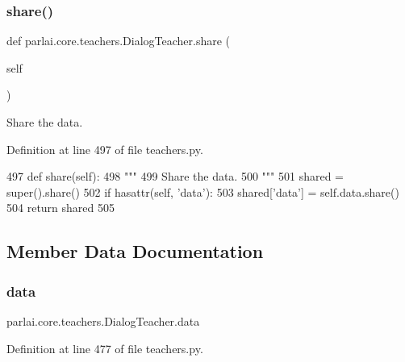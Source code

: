 \subsubsection{\texorpdfstring{share()}{share()}}
{\footnotesize\ttfamily def parlai.\+core.\+teachers.\+Dialog\+Teacher.\+share (\begin{DoxyParamCaption}\item[{}]{self }\end{DoxyParamCaption})}

\begin{DoxyVerb}Share the data.
\end{DoxyVerb}
 

Definition at line 497 of file teachers.\+py.


\begin{DoxyCode}
497     \textcolor{keyword}{def }share(self):
498         \textcolor{stringliteral}{"""}
499 \textcolor{stringliteral}{        Share the data.}
500 \textcolor{stringliteral}{        """}
501         shared = super().share()
502         \textcolor{keywordflow}{if} hasattr(self, \textcolor{stringliteral}{'data'}):
503             shared[\textcolor{stringliteral}{'data'}] = self.data.share()
504         \textcolor{keywordflow}{return} shared
505 
\end{DoxyCode}


\subsection{Member Data Documentation}
\mbox{\label{classparlai_1_1core_1_1teachers_1_1DialogTeacher_a6089018ef23e5f55862292d25628e6a5}} 
\subsubsection{\texorpdfstring{data}{data}}
{\footnotesize\ttfamily parlai.\+core.\+teachers.\+Dialog\+Teacher.\+data}



Definition at line 477 of file teachers.\+py.

\mbox{\label{classparlai_1_1core_1_1teachers_1_1DialogTeacher_a4bd247f78e23331700e150991d0afdba}} 
